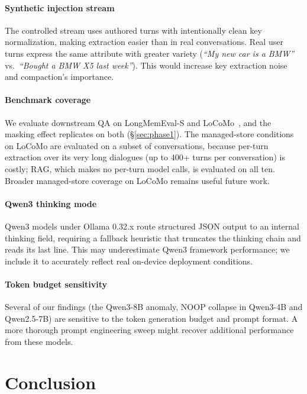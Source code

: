\documentclass[10pt, twocolumn]{article}
\begin{document}
\paragraph{Synthetic injection stream}
The controlled stream uses authored turns with intentionally clean key
normalization, making extraction easier than in real conversations.
Real user turns express the same attribute with greater variety
(\emph{``My new car is a BMW''} vs.\ \emph{``Bought a BMW X5 last week''}).
This would increase key extraction noise and compaction's importance.

\paragraph{Benchmark coverage}
We evaluate downstream QA on LongMemEval-S and
LoCoMo~\cite{maharana2024evaluating}, and the masking effect replicates on both
(\S\ref{sec:phase1}). The managed-store conditions on LoCoMo are evaluated on a
subset of conversations, because per-turn extraction over its very long dialogues
(up to 400+ turns per conversation) is costly; RAG, which makes no per-turn model
calls, is evaluated on all ten. Broader managed-store coverage on LoCoMo remains
useful future work.

\paragraph{Qwen3 thinking mode}
Qwen3 models under Ollama 0.32.x route structured JSON output to an
internal thinking field, requiring a fallback heuristic that truncates
the thinking chain and reads its last line.
This may underestimate Qwen3 framework performance; we include it to
accurately reflect real on-device deployment conditions.

\paragraph{Token budget sensitivity}
Several of our findings (the Qwen3-8B anomaly, NOOP collapse in Qwen3-4B
and Qwen2.5-7B) are sensitive to the token generation budget and prompt
format.
A more thorough prompt engineering sweep might recover additional performance
from these models.

\section{Conclusion}
\label{sec:conclusion}
\end{document}
